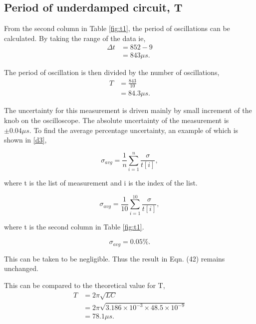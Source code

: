 \documentclass{article}
\begin{document}
\subsection{Period of underdamped circuit, T}
From the second column in Table \ref{fig:t1}, the period of oscillations 
can be calculated. By taking the range of the data ie,
\begin{equation}
    \begin{split}
        \Delta t &= 852 - 9 \\
        &= 843 \mu s.
    \end{split}
\end{equation}

The period of oscillation is then divided by the number of oscillations, 
\begin{equation}
    \begin{split}
        T &= \frac{843}{10} \\
        & = 84.3 \mu s.
    \end{split}
\end{equation}

The uncertainty for this measurement is driven mainly by small increment 
of the knob on the oscilloscope. The absolute uncertainty of the measurement
is $\pm 0.04\mu s.$ To find the average percentage uncertainty, an example
of which is shown in \ref{d3},

\begin{equation}
    \sigma_{avg} = \frac{1}{n}\sum_{i=1}^{n}\frac{\sigma}{t[i]},
\end{equation}

where t is the list of measurement and i is the index of the list.

\begin{equation}
    \sigma_{avg} = \frac{1}{10}\sum_{i=1}^{10}\frac{\sigma}{t[i]},
\end{equation}

where t is the second column in Table \ref{fig:t1}.

\begin{equation}
    \sigma_{avg} = 0.05\%.
\end{equation}

This can be taken to be negligible. Thus the result in Eqn. (42) remains
unchanged.

This can be compared to the theoretical value for T,
\begin{equation}
    \begin{split}
        T &= 2\pi \sqrt{LC} \\
        &= 2\pi \sqrt{3.186\times 10^{-3}\times 48.5\times 10^{-9}} \\
        &= 78.1 \mu s.
    \end{split}
\end{equation}
\end{document}
